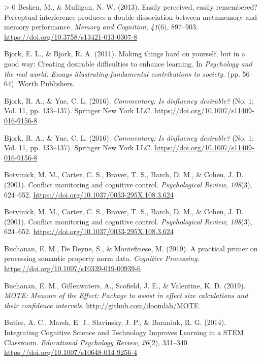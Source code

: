 \documentclass[
  english,
  jou]{apa7}
\newlength{\cslhangindent}
\newenvironment{CSLReferences}[3] %
 {%
  \setlength{\parindent}{0pt}
  \ifodd #1 \everypar{\setlength{\hangindent}{\cslhangindent}}\ignorespaces\fi
  \ifnum #2 > 0
  \setlength{\parskip}{#2\baselineskip}
  \fi
 }%
 {}
\begin{document}
\begin{CSLReferences}{1}{0}
\leavevmode\hypertarget{ref-Besken2013}{}%
Besken, M., \& Mulligan, N. W. (2013). {Easily perceived, easily remembered? Perceptual interference produces a double dissociation between metamemory and memory performance}. \emph{Memory and Cognition}, \emph{41}(6), 897--903. \url{https://doi.org/10.3758/s13421-013-0307-8}

\leavevmode\hypertarget{ref-Bjork2011}{}%
Bjork, E. L., \& Bjork, R. A. (2011). {Making things hard on yourself, but in a good way: Creating desirable difficulties to enhance learning.} In \emph{Psychology and the real world: Essays illustrating fundamental contributions to society.} (pp. 56--64). Worth Publishers.

\leavevmode\hypertarget{ref-Bjork2016}{}%
Bjork, R. A., \& Yue, C. L. (2016). \emph{{Commentary: Is disfluency desirable?}} (No. 1; Vol. 11, pp. 133--137). Springer New York LLC. \url{https://doi.org/10.1007/s11409-016-9156-8}

\leavevmode\hypertarget{ref-Bjork2016}{}%
Bjork, R. A., \& Yue, C. L. (2016). \emph{{Commentary: Is disfluency desirable?}} (No. 1; Vol. 11, pp. 133--137). Springer New York LLC. \url{https://doi.org/10.1007/s11409-016-9156-8}

\leavevmode\hypertarget{ref-Botvinick2001}{}%
Botvinick, M. M., Carter, C. S., Braver, T. S., Barch, D. M., \& Cohen, J. D. (2001). {Conflict monitoring and cognitive control}. \emph{Psychological Review}, \emph{108}(3), 624--652. \url{https://doi.org/10.1037/0033-295X.108.3.624}

\leavevmode\hypertarget{ref-Botvinick2001}{}%
Botvinick, M. M., Carter, C. S., Braver, T. S., Barch, D. M., \& Cohen, J. D. (2001). {Conflict monitoring and cognitive control}. \emph{Psychological Review}, \emph{108}(3), 624--652. \url{https://doi.org/10.1037/0033-295X.108.3.624}

\leavevmode\hypertarget{ref-Buchanan2019}{}%
Buchanan, E. M., De Deyne, S., \& Montefinese, M. (2019). {A practical primer on processing semantic property norm data}. \emph{Cognitive Processing}. \url{https://doi.org/10.1007/s10339-019-00939-6}

\leavevmode\hypertarget{ref-R-MOTE}{}%
Buchanan, E. M., Gillenwaters, A., Scofield, J. E., \& Valentine, K. D. (2019). \emph{{MOTE: Measure of the Effect}: Package to assist in effect size calculations and their confidence intervals}. \url{http://github.com/doomlab/MOTE}

\leavevmode\hypertarget{ref-Butler2014}{}%
Butler, A. C., Marsh, E. J., Slavinsky, J. P., \& Baraniuk, R. G. (2014). {Integrating Cognitive Science and Technology Improves Learning in a STEM Classroom}. \emph{Educational Psychology Review}, \emph{26}(2), 331--340. \url{https://doi.org/10.1007/s10648-014-9256-4}


\end{CSLReferences}
\end{document}
